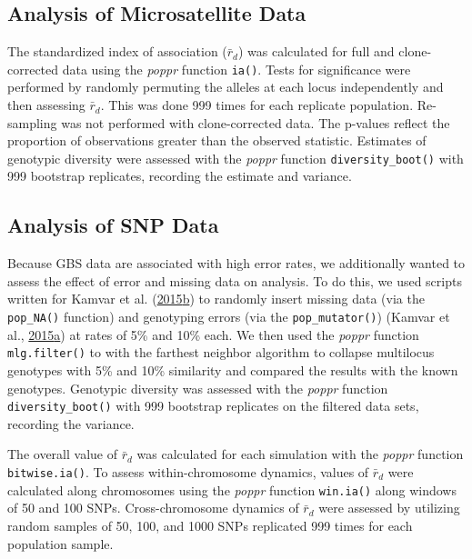 \documentclass[double,12pt]{beavtex}
\begin{document}
  \subsection{Analysis of Microsatellite
  Data}\label{analysis-of-microsatellite-data}
  
  The standardized index of association (\(\bar{r}_d\)) was calculated for
  full and clone-corrected data using the \emph{poppr} function
  \texttt{ia()}. Tests for significance were performed by randomly
  permuting the alleles at each locus independently and then assessing
  \(\bar{r}_d\). This was done 999 times for each replicate population.
  Re-sampling was not performed with clone-corrected data. The p-values
  reflect the proportion of observations greater than the observed
  statistic. Estimates of genotypic diversity were assessed with the
  \emph{poppr} function \texttt{diversity\_boot()} with 999 bootstrap
  replicates, recording the estimate and variance.
  
  \subsection{Analysis of SNP Data}\label{analysis-of-snp-data}
  
  Because GBS data are associated with high error rates, we additionally
  wanted to assess the effect of error and missing data on analysis. To do
  this, we used scripts written for Kamvar et al.
  (\protect\hyperlink{ref-kamvar2015novel}{2015}\protect\hyperlink{ref-kamvar2015novel}{b})
  to randomly insert missing data (via the \texttt{pop\_NA()} function)
  and genotyping errors (via the \texttt{pop\_mutator()}) (Kamvar et al.,
  \protect\hyperlink{ref-kamvar2015poppr2supp}{2015}\protect\hyperlink{ref-kamvar2015poppr2supp}{a})
  at rates of 5\% and 10\% each. We then used the \emph{poppr} function
  \texttt{mlg.filter()} to with the farthest neighbor algorithm to
  collapse multilocus genotypes with 5\% and 10\% similarity and compared
  the results with the known genotypes. Genotypic diversity was assessed
  with the \emph{poppr} function \texttt{diversity\_boot()} with 999
  bootstrap replicates on the filtered data sets, recording the variance.
  
  The overall value of \(\bar{r}_d\) was calculated for each simulation
  with the \emph{poppr} function \texttt{bitwise.ia()}. To assess
  within-chromosome dynamics, values of \(\bar{r}_d\) were calculated
  along chromosomes using the \emph{poppr} function \texttt{win.ia()}
  along windows of 50 and 100 SNPs. Cross-chromosome dynamics of
  \(\bar{r}_d\) were assessed by utilizing random samples of 50, 100, and
  1000 SNPs replicated 999 times for each population sample.
  
\end{document}
